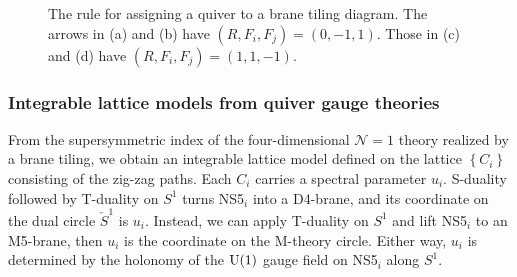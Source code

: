 \begin{figure}
{
    }
  \qquad
  \caption{The rule for assigning a quiver to a brane tiling diagram.
  The arrows in (a) and (b) have $(R, F_i, F_j)=(0, -1, 1)$. Those in
  (c) and (d) have $(R, F_i, F_j)=(1, 1, -1)$.}
  \label{fig:rule_for_quiver}
\end{figure}





\subsubsection{Integrable lattice models from quiver gauge theories}

From the supersymmetric index of the four-dimensional $\mathcal{N}=1$
theory realized by a brane tiling, we obtain an integrable lattice
model defined on the lattice $\left\{ C_{i}\right\} $ consisting
of the zig-zag paths. Each $C_{i}$ carries a spectral parameter $u_{i}$.
S-duality followed by T-duality on $S^{1}$ turns NS5$_{i}$ into
a D4-brane, and its coordinate on the dual circle $\check{S}^{1}$
is $u_{i}$. Instead, we can apply T-duality on $S^{1}$ and lift
NS5$_{i}$ to an M5-brane, then $u_{i}$ is the coordinate on the
M-theory circle. Either way, $u_{i}$ is determined by the holonomy
of the $\mathrm{U}(1)$ gauge field on NS5$_{i}$ along $S^{1}$.

